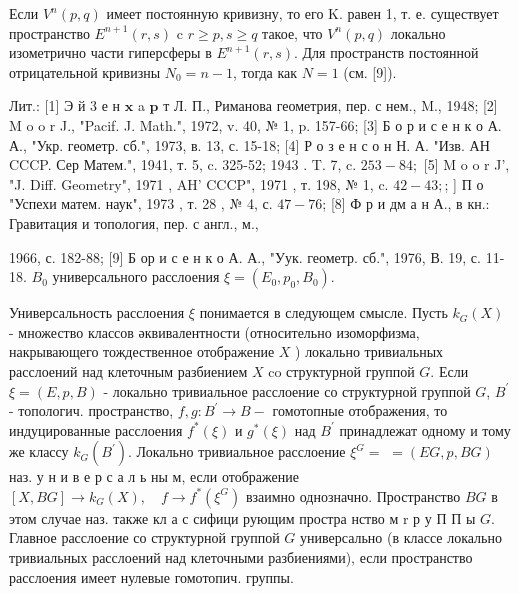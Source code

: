 \documentclass[10pt]{article}
\begin{document}
Если $V^{n}(p, q)$ имеет постоянную кривизну, то его K. равен 1, т. е. существует пространство $E^{n+1}(r, s)$ c $r \geqslant p, s \geqslant q$ такое, что $V^{n}(p, q)$ локально изометрично части гиперсферы в $E^{n+1}(r, s)$. Для пространств постоянной отрицательной кривизны $N_{0}=n-1$, тогда как $N=1$ (см. [9]).



Лит.: [1] Э й 3 е н $\mathbf{x}$ a $\mathbf{p}$ т Л. П., Риманова геометрия, пер. с нем., M., 1948; [2] M o o r J., "Pacif. J. Math.", 1972, v. 40, № 1, p. 157-66; [3] Б о р и с е н к о А. А., "Укр. геометр. сб.", 1973, в. 13, с. 15-18; [4] Р о з е н с о н Н. А. "Изв. АН CCCP. Сер Матем.", 1941, т. 5, c. 325-52; 1943 . T. 7, c. $253-84 ;$ [5] M o o r J', "J. Diff. Geometry", 1971 , AH' CCCP", 1971 , т. 198, № 1, c. $42-43 ;$; ] П о "Успехи матем. наук", 1973 , т. 28 , № 4, с. $47-76$; [8] Ф р и дм а н А., в кн.: Гравитация и топология, пер. с англ., м.,

1966, с. 182-88; [9] Б ор и с е н к о А. А., "Уук. геометр. сб.", 1976, В. 19, с. 11-18. $B_{0}$ универсального расслоения $\xi=\left(E_{0}, p_{0}, B_{0}\right)$.



Универсальность расслоения $\xi$ понимается в следующем смысле. Пусть $k_{G}(X)$ - множество классов әквивалентности (относительно изоморфизма, накрывающего тождественное отображение $X$ ) локально тривиальных расслоений над клеточным разбиением $X$ co структурной группой $G$. Если $\xi=(E, p, B)$ - локально тривиальное расслоение со структурной группой $G$, $B^{\prime}$ - топологич. пространство, $f, g: B^{\prime} \rightarrow B-$ гомотопные отображения, то индуцированные расслоения $f^{*}(\xi)$ и $g^{*}(\xi)$ над $B^{\prime}$ принадлежат одному и тому же классу $k_{G}\left(B^{\prime}\right)$. Локально тривиальное расслоение $\xi^{G}=$ $=(E G, p, B G)$ наз. у н и в е р с а л ь ны м, если отображение $[X, B G] \rightarrow k_{G}(X), \quad f \rightarrow f^{*}\left(\xi^{G}\right)$ взаимно однозначно. Пространство $B G$ в этом случае наз. также кл а с сифици рующим простра нство м r р у П П ы $G$. Главное расслоение со структурной группой $G$ универсально (в классе локально тривиальных расслоений над клеточными разбиениями), если пространство расслоения имеет нулевые гомотопич. группы.
\end{document}

